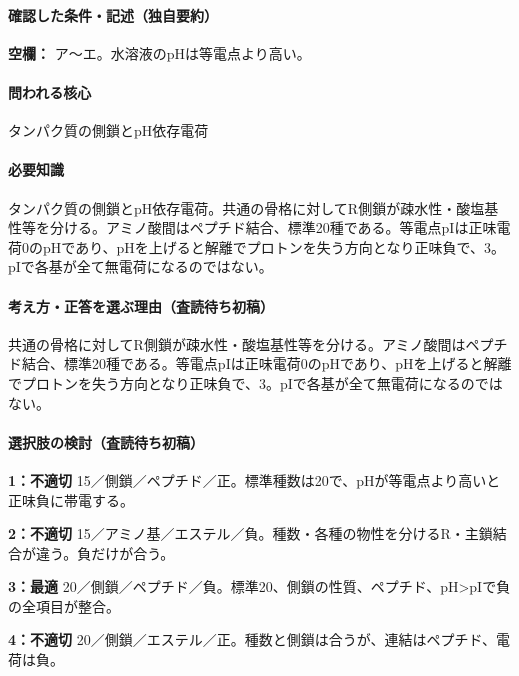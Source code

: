 \paragraph{確認した条件・記述（独自要約）}\mbox{}\par

\noindent\textbf{空欄：} ア〜エ。水溶液のpHは等電点より高い。\par

\paragraph{問われる核心} タンパク質の側鎖とpH依存電荷

\paragraph{必要知識} タンパク質の側鎖とpH依存電荷。共通の骨格に対してR側鎖が疎水性・酸塩基性等を分ける。アミノ酸間はペプチド結合、標準20種である。等電点pIは正味電荷0のpHであり、pHを上げると解離でプロトンを失う方向となり正味負で、3。pIで各基が全て無電荷になるのではない。

\paragraph{考え方・正答を選ぶ理由（査読待ち初稿）} 共通の骨格に対してR側鎖が疎水性・酸塩基性等を分ける。アミノ酸間はペプチド結合、標準20種である。等電点pIは正味電荷0のpHであり、pHを上げると解離でプロトンを失う方向となり正味負で、3。pIで各基が全て無電荷になるのではない。

\paragraph{選択肢の検討（査読待ち初稿）}\mbox{}\par

\noindent\textbf{1：不適切} 15／側鎖／ペプチド／正。標準種数は20で、pHが等電点より高いと正味負に帯電する。\par

\noindent\textbf{2：不適切} 15／アミノ基／エステル／負。種数・各種の物性を分けるR・主鎖結合が違う。負だけが合う。\par

\noindent\textbf{3：最適} 20／側鎖／ペプチド／負。標準20、側鎖の性質、ペプチド、pH>pIで負の全項目が整合。\par

\noindent\textbf{4：不適切} 20／側鎖／エステル／正。種数と側鎖は合うが、連結はペプチド、電荷は負。\par

